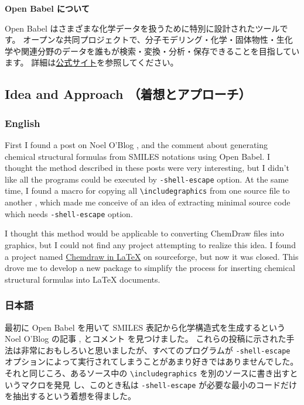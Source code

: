 \documentclass[12pt]{jsarticle}
\begin{document}
\noindent \textbf{Open Babel について}

Open Babel はさまざまな化学データを扱うために特別に設計されたツールです。
オープンな共同プロジェクトで、分子モデリング・化学・固体物性・生化学や関連分野のデータを誰もが検索・変換・分析・保存できることを目指しています。
詳細は\href{http://openbabel.org/}{公式サイト}を参照してください。

\clearpage

\subsection{Idea and Approach （着想とアプローチ）}

\subsubsection{English}
First I found a post on Noel O'Blog \cite{NOB1}, \cite{NOB2} and the comment \cite{JLA} about generating chemical structural formulas from SMILES notations using Open Babel.
I thought the method described in these posts were very interesting, but I didn't like all the programs could be executed by \verb|-shell-escape| option.
At the same time, I found a macro for copying all \verb|\includegraphics| from one source file to another \cite{OKU}, which made me conceive of an idea of extracting minimal source code which needs \verb|-shell-escape| option.

I thought this method would be applicable to converting ChemDraw files into graphics, but I could not find any project attempting to realize this idea.
I found a project named \href{http://chemdrawinlatex.sourceforge.net/}{Chemdraw in \LaTeX} on sourceforge, but now it was closed.
This drove me to develop a new package to simplify the process for inserting chemical structural formulas into {\LaTeX} documents.

\subsubsection{日本語}

最初に Open Babel を用いて SMILES 表記から化学構造式を生成するという Noel O'Blog の記事 \cite{NOB1}, \cite{NOB2} とコメント \cite{JLA} を見つけました。
これらの投稿に示された手法は非常におもしろいと思いましたが、すべてのプログラムが \verb|-shell-escape| オプションによって実行されてしまうことがあまり好きではありませんでした。
それと同じころ、あるソース中の \verb|\includegraphics| を別のソースに書き出すというマクロを発見 \cite{OKU} し、このとき私は \verb|-shell-escape| が必要な最小のコードだけを抽出するという着想を得ました。
\end{document}
